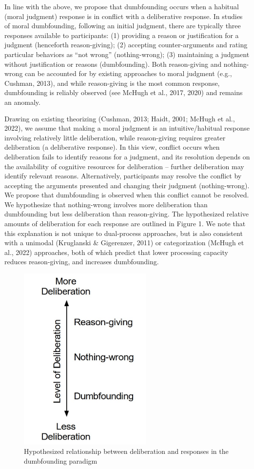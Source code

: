 \documentclass[
  american,
  man,floatsintext]{apa7}
\begin{document}
In line with the above, we propose that dumbfounding occurs when a habitual (moral judgment) response is in conflict with a deliberative response. In studies of moral dumbfounding, following an initial judgment, there are typically three responses available to participants: (1) providing a reason or justification for a judgment (henceforth reason-giving); (2) accepting counter-arguments and rating particular behaviors as \enquote{not wrong} (nothing-wrong); (3) maintaining a judgment without justification or reasons (dumbfounding). Both reason-giving and nothing-wrong can be accounted for by existing approaches to moral judgment (e.g., Cushman, 2013), and while reason-giving is the most common response, dumbfounding is reliably observed (see McHugh et al., 2017, 2020) and remains an anomaly.

Drawing on existing theorizing (Cushman, 2013; Haidt, 2001; McHugh et al., 2022), we assume that making a moral judgment is an intuitive/habitual response involving relatively little deliberation, while reason-giving requires greater deliberation (a deliberative response). In this view, conflict occurs when deliberation fails to identify reasons for a judgment, and its resolution depends on the availability of cognitive resources for deliberation -- further deliberation may identify relevant reasons. Alternatively, participants may resolve the conflict by accepting the arguments presented and changing their judgment (nothing-wrong). We propose that dumbfounding is observed when this conflict cannot be resolved. We hypothesize that nothing-wrong involves more deliberation than dumbfounding but less deliberation than reason-giving. The hypothesized relative amounts of deliberation for each response are outlined in Figure 1. We note that this explanation is not unique to dual-process approaches, but is also consistent with a unimodal (Kruglanski \& Gigerenzer, 2011) or categorization (McHugh et al., 2022) approaches, both of which predict that lower processing capacity reduces reason-giving, and increases dumbfounding.

\begin{figure}
\centering
\includegraphics[width=2.60417in,height=\textheight]{../resources/images/responses_figure4.jpg}
\caption{Hypothesized relationship between deliberation and responses in the dumbfounding paradigm}
\end{figure}
\end{document}
